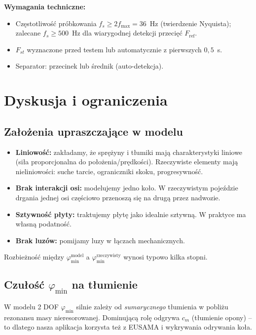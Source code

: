 \documentclass[11pt,a4paper]{article}
\theoremstyle{plainpol}
\begin{document}
\textbf{Wymagania techniczne:}
\begin{itemize}
  \item Częstotliwość próbkowania $f_s \geq 2 f_{\max} = 36$~Hz
    (twierdzenie Nyquista); zalecane $f_s \geq 500$~Hz dla wiarygodnej
    detekcji przecięć $F_{\mathrm{ref}}$.
  \item $F_{st}$ wyznaczone przed testem lub automatycznie z
    pierwszych $0{,}5$~s.
  \item Separator: przecinek lub średnik (auto-detekcja).
\end{itemize}

\section{Dyskusja i ograniczenia}

\subsection{Założenia upraszczające w modelu}

\begin{itemize}
  \item \textbf{Liniowość:} zakładamy, że sprężyny i tłumiki mają
    charakterystyki liniowe (siła proporcjonalna do położenia/prędkości).
    Rzeczywiste elementy mają nieliniowości: suche tarcie, ograniczniki
    skoku, progresywność.
  \item \textbf{Brak interakcji osi:} modelujemy jedno koło. W rzeczywistym
    pojeździe drgania jednej osi częściowo przenoszą się na drugą przez
    nadwozie.
  \item \textbf{Sztywność płyty:} traktujemy płytę jako idealnie
    sztywną. W praktyce ma własną podatność.
  \item \textbf{Brak luzów:} pomijamy luzy w łączach mechanicznych.
\end{itemize}

Rozbieżność między $\varphi_{\min}^{\text{model}}$ a
$\varphi_{\min}^{\text{rzeczywisty}}$ wynosi typowo kilka stopni.

\subsection{Czułość $\varphi_{\min}$ na tłumienie}

W modelu 2 DOF $\varphi_{\min}$ silnie zależy od \emph{sumarycznego}
tłumienia w pobliżu rezonansu masy nieresorowanej. Dominującą rolę
odgrywa $c_m$ (tłumienie opony) -- to dlatego nasza aplikacja korzysta
też z EUSAMA i wykrywania odrywania koła.
\end{document}

